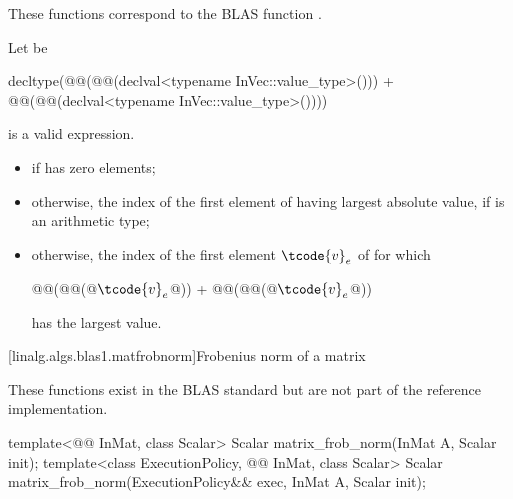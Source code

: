 \begin{itemdescr}
\pnum
\begin{note}
These functions correspond to the BLAS function \supercite{blas1}.
\end{note}

\pnum
Let  be
\begin{codeblock}
decltype(@@(@@(declval<typename InVec::value_type>())) +
         @@(@@(declval<typename InVec::value_type>())))
\end{codeblock}

\pnum
\mandates
{} is a valid expression.

\pnum
\returns
\begin{itemize}
\item
{}
      if  has zero elements;
\item
otherwise, the index of the first element of 
having largest absolute value,
if  is an arithmetic type;
\item
otherwise, the index of the first element $\tcode{v}_e$ of 
for which
\begin{codeblock}
@@(@@(@$\tcode{v}_e$@)) + @@(@@(@$\tcode{v}_e$@))
\end{codeblock}
has the largest value.
\end{itemize}
\end{itemdescr}

[linalg.algs.blas1.matfrobnorm]{Frobenius norm of a matrix}

\pnum
\begin{note}
These functions exist in the BLAS standard\supercite{blas-std}
but are not part of the reference implementation.
\end{note}
\begin{itemdecl}
template<@@ InMat, class Scalar>
  Scalar matrix_frob_norm(InMat A, Scalar init);
template<class ExecutionPolicy, @@ InMat, class Scalar>
  Scalar matrix_frob_norm(ExecutionPolicy&& exec, InMat A, Scalar init);
\end{itemdecl}

